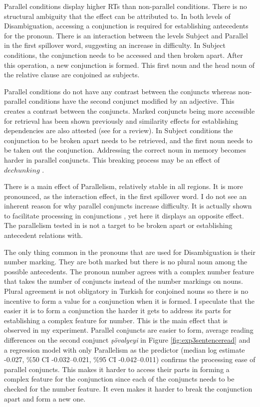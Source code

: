 Parallel conditions display higher RTs than non-parallel conditions. There is no structural ambiguity that the effect can be attributed to. In both levels of Disambiguation, accessing a conjunction is required for establishing antecedents for the pronoun. There is an interaction between the levels Subject and Parallel in the first spillover word, suggesting an increase in difficulty. In Subject conditions, the conjunction needs to be accessed and then broken apart. After this operation, a new conjunction is formed. This first noun and the head noun of the relative clause are conjoined as subjects.


Parallel conditions do not have any contrast between the conjuncts whereas non-parallel conditions have the second conjunct modified by an adjective. This creates a contrast between the conjuncts. Marked conjuncts being more accessible for retrieval has been shown previously \citep{Hofmeister2014} and similarity effects for establishing dependencies are also attested (see \cite{Jager2017} for a review). In Subject conditions the conjunction to be broken apart needs to be retrieved, and the first noun needs to be taken out the conjunction. Addressing the correct noun in memory becomes harder in parallel conjuncts. This breaking process may be an effect of $dechunking$ \cite{martin2011direct}.


There is a main effect of Parallelism, relatively stable in all regions. It is more pronounced, as the interaction effect, in the first spillover word. I do not see an inherent reason for why parallel conjuncts increase difficulty. It is actually shown to facilitate processing in conjunctions \citep{frazier2000processing}, yet here it displays an opposite effect. The parallelism tested in \citep{frazier2000processing} is not a target to be broken apart or establishing antecedent relations with. 


The only thing common in the pronouns that are used for Disambiguation is their number marking. They are both marked {\Pl} but there is no plural noun among the possible antecedents. The pronoun number agrees with a complex number feature that takes the number of conjuncts instead of the number markings on nouns. Plural agreement is not obligatory in Turkish for conjoined nouns so there is no incentive to form a {\Pl} value for a conjunction when it is formed. I speculate that the easier it is to form a conjunction the harder it gets to address its parts for establishing a complex feature for number. This is the main effect that is observed in my experiment. Parallel conjuncts are easier to form, average reading differences on the second conjunct \textit{şövalyeyi} in Figure \ref{fig:exp3sentenceread} and a regression model with only Parallelism as the predictor (median log estimate -0.027, \%50 CI -0.032--0.021, \%95 CI -0.042--0.011) confirms the processing ease of parallel conjuncts. This makes it harder to access their parts in forming a complex feature for the conjunction since each of the conjuncts needs to be checked for the number feature. It even makes it harder to break the conjunction apart and form a new one.



